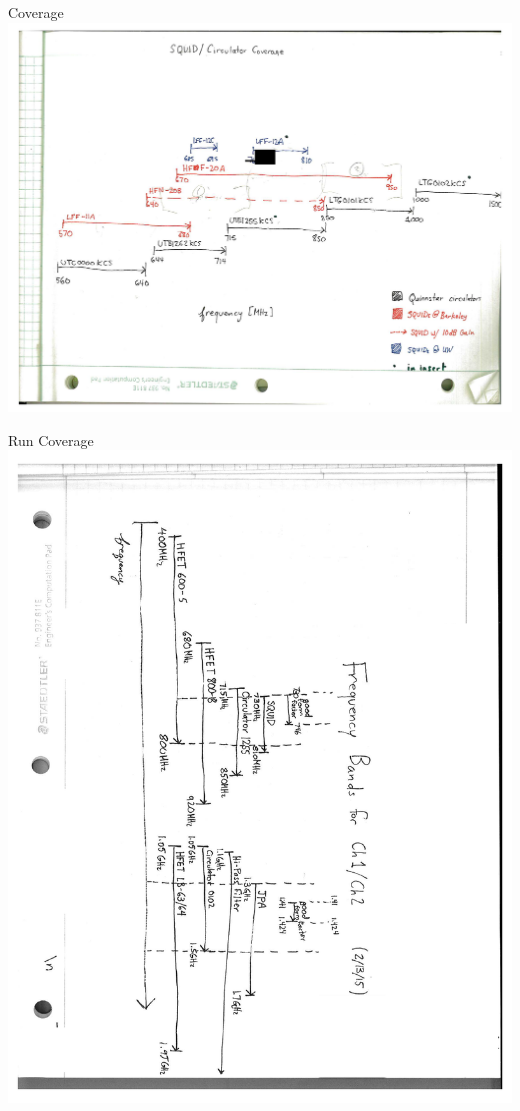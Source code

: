 \documentclass{beamer}
\begin{document}
\begin{frame}{Coverage}
\includegraphics[width=.9\textwidth]{copier_20150502_210746_pg2_revised}
\end{frame}

\begin{frame}{Run Coverage}
\includegraphics[width=.7\textwidth, angle=90]{copier_20150502_210746_pg1}
\end{frame}
\end{document}

